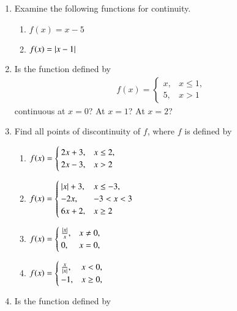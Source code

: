 \begin{enumerate}[label=\arabic*.,ref=\thesubsection.\theenumi]
\item Examine the following functions for continuity.
%
\begin{enumerate}
\item $f(x) = x-5$
\item $f(x) = \left\vert x-1\right\vert$
\end{enumerate}
%
\item Is the function defined by 
%
\begin{align}
f(x)=
\begin{cases}
x, & x \le 1,
\\
5, & x > 1
\end{cases}
\end{align}
%
continuous at $x = 0$? At $x = 1$? At $x = 2$?
\item Find all points of discontinuity of $f$, where $f$ is defined by
%
\begin{enumerate}
\item 
$
\begin{alignedat}[t]{2}
f(x)=
\begin{cases}
2x+3, & x \le 2,
\\
2x-3, & x > 2
\end{cases}
\end{alignedat}
$
%
\item 
$
\begin{alignedat}[t]{2}
f(x)=
\begin{cases}
\left\vert x\right\vert+3, & x \le -3,
\\
-2x, & -3 < x < 3
\\
6x+2, & x \ge 2
\end{cases}
\end{alignedat}
$
\item 
$
\begin{alignedat}[t]{2}
f(x)=
\begin{cases}
\frac{\left\vert x\right\vert}{x}, & x \ne 0,
\\
0, & x = 0,
\end{cases}
\end{alignedat}
$
\item 
$
\begin{alignedat}[t]{2}
f(x)=
\begin{cases}
\frac{x}{\left\vert x\right\vert}, & x < 0,
\\
-1, & x \ge 0,
\end{cases}
\end{alignedat}
$
\end{enumerate}
%
\item Is the function defined by 
%
\begin{align}

\end{align}
\end{enumerate}
